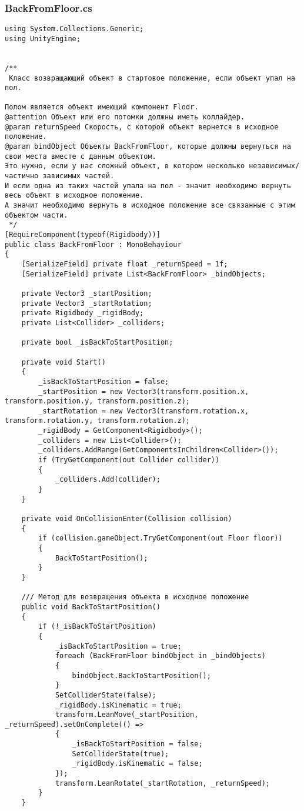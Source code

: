 \subsubsection*{BackFromFloor.cs}
\begin{verbatim}
﻿using System.Collections.Generic;
using UnityEngine;


/**
 Класс возвращающий объект в стартовое положение, если объект упал на пол.

Полом является объект имеющий компонент Floor.
@attention Объект или его потомки должны иметь коллайдер.
@param returnSpeed Скорость, с которой объект вернется в исходное положение.
@param bindObject Объекты BackFromFloor, которые должны вернуться на свои места вместе с данным объектом.
Это нужно, если у нас сложный объект, в котором несколько независимых/частично зависимых частей.
И если одна из таких частей упала на пол - значит необходимо вернуть весь объект в исходное положение.
А значит необходимо вернуть в исходное положение все связанные с этим объектом части.
 */
[RequireComponent(typeof(Rigidbody))]
public class BackFromFloor : MonoBehaviour
{
    [SerializeField] private float _returnSpeed = 1f;
    [SerializeField] private List<BackFromFloor> _bindObjects;

    private Vector3 _startPosition;
    private Vector3 _startRotation;
    private Rigidbody _rigidBody;
    private List<Collider> _colliders;

    private bool _isBackToStartPosition;

    private void Start()
    {
        _isBackToStartPosition = false;
        _startPosition = new Vector3(transform.position.x, transform.position.y, transform.position.z);
        _startRotation = new Vector3(transform.rotation.x, transform.rotation.y, transform.rotation.z);
        _rigidBody = GetComponent<Rigidbody>();
        _colliders = new List<Collider>();
        _colliders.AddRange(GetComponentsInChildren<Collider>());
        if (TryGetComponent(out Collider collider))
        {
            _colliders.Add(collider);
        }
    }

    private void OnCollisionEnter(Collision collision)
    {
        if (collision.gameObject.TryGetComponent(out Floor floor))
        {
            BackToStartPosition();
        }
    }

    /// Метод для возвращения объекта в исходное положение
    public void BackToStartPosition()
    {
        if (!_isBackToStartPosition)
        {
            _isBackToStartPosition = true;
            foreach (BackFromFloor bindObject in _bindObjects)
            {
                bindObject.BackToStartPosition();
            }
            SetColliderState(false);
            _rigidBody.isKinematic = true;
            transform.LeanMove(_startPosition, _returnSpeed).setOnComplete(() =>
            {
                _isBackToStartPosition = false;
                SetColliderState(true);
                _rigidBody.isKinematic = false;
            });
            transform.LeanRotate(_startRotation, _returnSpeed);
        }
    }


\end{verbatim}
